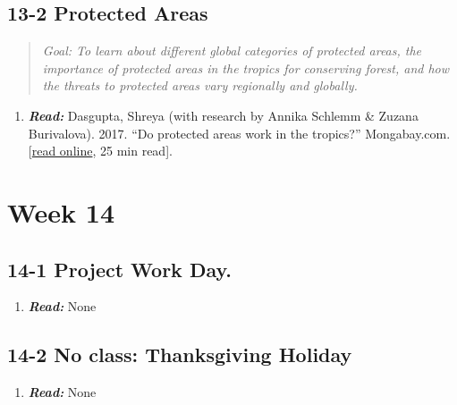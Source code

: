 \documentclass[
  10pt,
  letterpaper,
  oneside,
  open=any]{scrbook}
\providecommand{\tightlist}{%
  \setlength{\itemsep}{0pt}\setlength{\parskip}{0pt}}\usepackage{longtable,booktabs,array}
\begin{document}
\subsection*{13-2 Protected Areas}\label{protected-areas}

\begin{quote}
\emph{Goal: To learn about different global categories of protected
areas, the importance of protected areas in the tropics for conserving
forest, and how the threats to protected areas vary regionally and
globally.}
\end{quote}

\begin{enumerate}
\def\labelenumi{\arabic{enumi}.}
\tightlist
\item
  \textbf{\emph{Read:}} Dasgupta, Shreya (with research by Annika
  Schlemm \& Zuzana Burivalova). 2017. ``Do protected areas work in the
  tropics?'' Mongabay.com.
  {[}\href{https://news.mongabay.com/2017/12/do-protected-areas-work-in-the-tropics/}{read
  online}, 25 min read{]}.
\end{enumerate}

\section{Week 14}\label{week-14}

\subsection*{14-1 Project Work Day.}\label{project-work-day.}

\begin{enumerate}
\def\labelenumi{\arabic{enumi}.}
\tightlist
\item
  \textbf{\emph{Read:}} None
\end{enumerate}

\subsection*{14-2 No class: Thanksgiving
Holiday}\label{no-class-thanksgiving-holiday}

\begin{enumerate}
\def\labelenumi{\arabic{enumi}.}
\tightlist
\item
  \textbf{\emph{Read:}} None
\end{enumerate}
\end{document}

